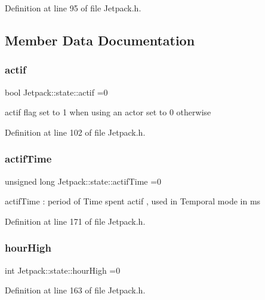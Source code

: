 Definition at line 95 of file Jetpack.\+h.



\subsection{Member Data Documentation}
\mbox{\label{struct_jetpack_1_1state_aa177541689bbaea21a4650a083b0df77}} 
\subsubsection{\texorpdfstring{actif}{actif}}
{\footnotesize\ttfamily bool Jetpack\+::state\+::actif =0}

actif flag set to 1 when using an actor set to 0 otherwise 

Definition at line 102 of file Jetpack.\+h.

\mbox{\label{struct_jetpack_1_1state_af2e1cc323ef9ffcc3cf4d203f85d726b}} 
\subsubsection{\texorpdfstring{actif\+Time}{actifTime}}
{\footnotesize\ttfamily unsigned long Jetpack\+::state\+::actif\+Time =0}

actif\+Time \+: period of Time spent actif , used in Temporal mode in ms 

Definition at line 171 of file Jetpack.\+h.

\mbox{\label{struct_jetpack_1_1state_ace824f4ae57fa1a4a27b2c6477b350e3}} 
\subsubsection{\texorpdfstring{hour\+High}{hourHigh}}
{\footnotesize\ttfamily int Jetpack\+::state\+::hour\+High =0}



Definition at line 163 of file Jetpack.\+h.

